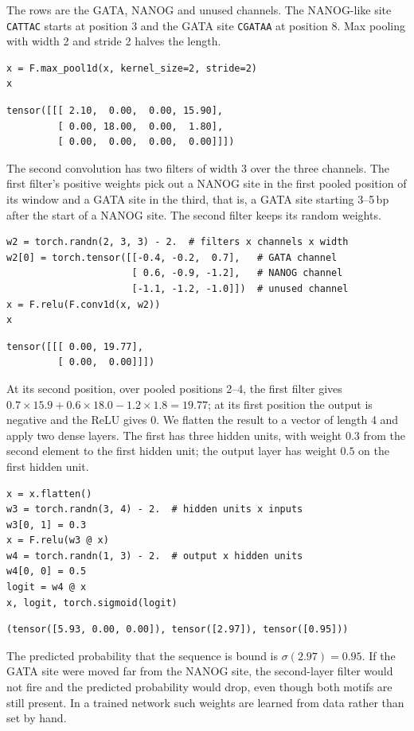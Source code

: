 The rows are the GATA, NANOG and unused channels. The NANOG-like site \texttt{CATTAC} starts at position 3 and the GATA site \texttt{CGATAA} at position 8. Max pooling with width 2 and stride 2 halves the length.
\begin{lstlisting}[style=pycode]
x = F.max_pool1d(x, kernel_size=2, stride=2)
x
\end{lstlisting}
\begin{lstlisting}[style=pyout]
tensor([[[ 2.10,  0.00,  0.00, 15.90],
         [ 0.00, 18.00,  0.00,  1.80],
         [ 0.00,  0.00,  0.00,  0.00]]])
\end{lstlisting}
The second convolution has two filters of width 3 over the three channels. The first filter's positive weights pick out a NANOG site in the first pooled position of its window and a GATA site in the third, that is, a GATA site starting 3--5\,bp after the start of a NANOG site. The second filter keeps its random weights.
\begin{lstlisting}[style=pycode]
w2 = torch.randn(2, 3, 3) - 2.  # filters x channels x width
w2[0] = torch.tensor([[-0.4, -0.2,  0.7],   # GATA channel
                      [ 0.6, -0.9, -1.2],   # NANOG channel
                      [-1.1, -1.2, -1.0]])  # unused channel
x = F.relu(F.conv1d(x, w2))
x
\end{lstlisting}
\begin{lstlisting}[style=pyout]
tensor([[[ 0.00, 19.77],
         [ 0.00,  0.00]]])
\end{lstlisting}
At its second position, over pooled positions 2--4, the first filter gives $0.7\times15.9 + 0.6\times18.0 - 1.2\times1.8 = 19.77$; at its first position the output is negative and the ReLU gives 0. We flatten the result to a vector of length 4 and apply two dense layers. The first has three hidden units, with weight $0.3$ from the second element to the first hidden unit; the output layer has weight $0.5$ on the first hidden unit.
\begin{lstlisting}[style=pycode]
x = x.flatten()
w3 = torch.randn(3, 4) - 2.  # hidden units x inputs
w3[0, 1] = 0.3
x = F.relu(w3 @ x)
w4 = torch.randn(1, 3) - 2.  # output x hidden units
w4[0, 0] = 0.5
logit = w4 @ x
x, logit, torch.sigmoid(logit)
\end{lstlisting}
\begin{lstlisting}[style=pyout]
(tensor([5.93, 0.00, 0.00]), tensor([2.97]), tensor([0.95]))
\end{lstlisting}
The predicted probability that the sequence is bound is $\sigma(2.97)=0.95$. If the GATA site were moved far from the NANOG site, the second-layer filter would not fire and the predicted probability would drop, even though both motifs are still present. In a trained network such weights are learned from data rather than set by hand.

